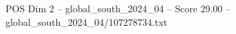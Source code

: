 \begin{textsample}{POS Dim 2 – global\_south\_2024\_04 – Score 29.00 – global\_south\_2024\_04/107278734.txt}
\end{textsample}
